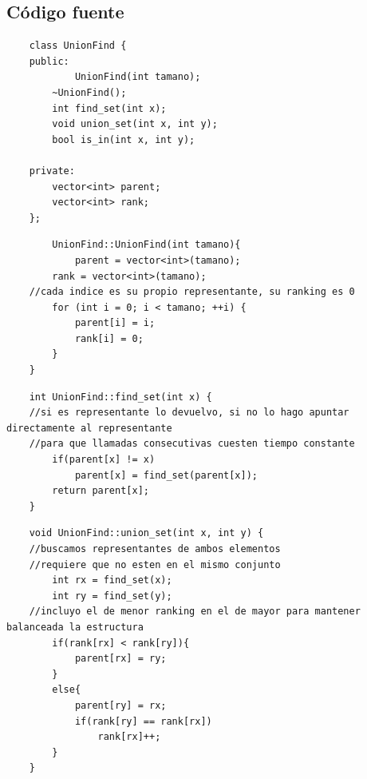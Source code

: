 \subsection{C\'odigo fuente}

	\begin{codesnippet}
	\begin{verbatim}
    class UnionFind {
    public:
        	UnionFind(int tamano);
        ~UnionFind();
        int find_set(int x);
        void union_set(int x, int y);
        bool is_in(int x, int y);

    private:
        vector<int> parent;
        vector<int> rank;
    };
	\end{verbatim}
	\end{codesnippet}

	\begin{codesnippet}
	\begin{verbatim}
    	UnionFind::UnionFind(int tamano){
        	parent = vector<int>(tamano);
        rank = vector<int>(tamano);
    //cada indice es su propio representante, su ranking es 0
        for (int i = 0; i < tamano; ++i) {
            parent[i] = i;
            rank[i] = 0;
        }
    }
	\end{verbatim}
	\end{codesnippet}

	\begin{codesnippet}
	\begin{verbatim}
    int UnionFind::find_set(int x) {
    //si es representante lo devuelvo, si no lo hago apuntar directamente al representante
    //para que llamadas consecutivas cuesten tiempo constante
        if(parent[x] != x)
            parent[x] = find_set(parent[x]);
        return parent[x];
    }
	\end{verbatim}
	\end{codesnippet}

	\begin{codesnippet}
	\begin{verbatim}
    void UnionFind::union_set(int x, int y) {
    //buscamos representantes de ambos elementos
    //requiere que no esten en el mismo conjunto
        int rx = find_set(x);
        int ry = find_set(y);
    //incluyo el de menor ranking en el de mayor para mantener balanceada la estructura
        if(rank[rx] < rank[ry]){
            parent[rx] = ry;
        }
        else{
            parent[ry] = rx;
            if(rank[ry] == rank[rx])
                rank[rx]++;
        }
    }
	\end{verbatim}
	\end{codesnippet}

